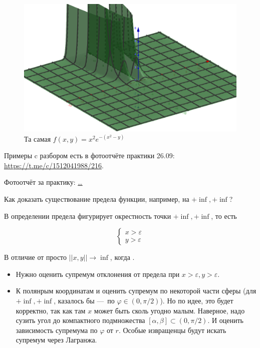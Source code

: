 \documentclass[12pt, a4paper]{article}
\begin{document}
\begin{figure}[h!]
  \centering
  \includegraphics[width=\textwidth]{res/weird_func_no_lim.png}
  \caption{Та самая $f(x,y)=x^2 e^{-(x^2-y)}$}
  \label{fig:no_lim}
\end{figure}
\FloatBarrier 

Примеры c разбором есть в фотоотчёте практики 26.09: \url{https://t.me/c/1512041988/216}. 


Фотоотчёт за практику: \url{…}

Как доказать существование предела функции, например, на $+\inf, +\inf$?

В определении предела фигурирует окрестность точки $+\inf, +\inf$, то есть

\begin{equation}
  \begin{cases}
    x > \varepsilon \\
    y > \varepsilon
  \end{cases}
\end{equation}

В отличие от просто $||x, y|| → \inf$, когда .

\begin{itemize}
  \item Нужно оценить супремум отклонения от предела при $x > \varepsilon, y > \varepsilon$.
  \item К полянрым координатам и оценить супремум по некоторой части сферы (для $+\inf, +\inf$, казалось бы — по $\varphi \in (0, \pi/2)$). 
  Но по идее, это будет корректно, так как там $x$ может быть сколь угодно малым. Наверное, надо сузить угол до компактного подмножества $[\alpha, \beta] \subset (0, \pi/2)$.
  И оценить зависимость {супремума по $\varphi$} от $r$.
  Особые извращенцы будут искать супремум через Лагранжа.
\end{itemize}
\end{document}
